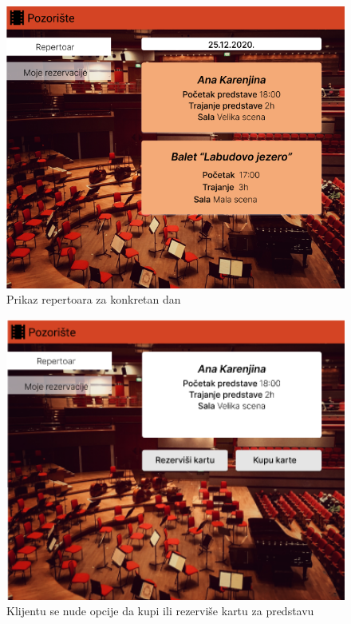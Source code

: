 \documentclass[a4paper]{article}
\begin{document}
\begin{figure}[H]
  \begin{center}
    \includegraphics[width=130mm]{../images/ui_klijent_repertoar2.png}
  \end{center}
  \caption{Prikaz repertoara za konkretan dan}
  \label{klijent_dnevni_repertoar}
\end{figure}

\begin{figure}[H]
  \begin{center}
    \includegraphics[width=130mm]{../images/ui_klijent_rezervacija1.png}
  \end{center}
  \caption{Klijentu se nude opcije da kupi ili rezerviše kartu za predstavu}
  \label{klijent_karte}
\end{figure}
\end{document}
